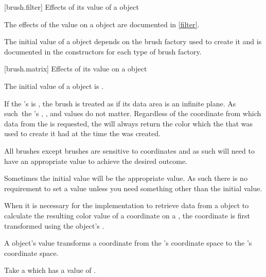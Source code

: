 %
 [brush.filter] {Effects of its  value of a  object}

\pnum
The effects of the  value on a  object are documented in \ref{filter}.

\pnum
The initial  value of a  object depends on the brush factory used to create it and is documented in the  constructors for each type of brush factory.

 [brush.matrix] {Effects of its  value on a  object}

\pnum
The initial  value of a  object is .

\pnum
If the 's  is , the brush is treated as if its data area is an infinite plane. As such\ the 's , , and  values do not matter. Regardless of the coordinate from which data from the  is requested, the  will always return the color which the  that was used to create it had at the time the  was created.

\pnum
All brushes except  brushes are sensitive to coordinates and as such will need to have an appropriate  value to achieve the desired outcome.

\pnum
\enternote
Sometimes the initial  value will be the appropriate value. As such there is no requirement to set a  value unless you need something other than the initial value.
\exitnote

\pnum
When it is necessary for the implementation to retrieve data from a  object to calculate the resulting color value of a coordinate on a , the coordinate is first transformed using the  object's .

\pnum
A  object's  value transforms a coordinate from the 's coordinate space to the 's coordinate space.

\pnum
\enterexample
Take a  which has a  value of .

